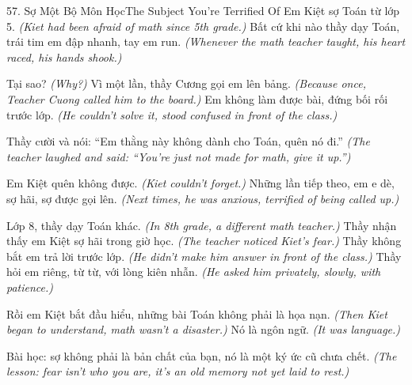 \begin{truyen}{57. Sợ Một Bộ Môn Học}{The Subject You're Terrified Of}
Em Kiệt sợ Toán từ lớp 5.
\textit{(Kiet had been afraid of math since 5th grade.)}
Bất cứ khi nào thầy dạy Toán, trái tim em đập nhanh, tay em run.
\textit{(Whenever the math teacher taught, his heart raced, his hands shook.)}

Tại sao?
\textit{(Why?)}
Vì một lần, thầy Cương gọi em lên bảng.
\textit{(Because once, Teacher Cuong called him to the board.)}
Em không làm được bài, đứng bối rối trước lớp.
\textit{(He couldn't solve it, stood confused in front of the class.)}

Thầy cười và nói: ``Em thằng này không dành cho Toán, quên nó đi.''
\textit{(The teacher laughed and said: ``You're just not made for math, give it up.'')}

Em Kiệt quên không được.
\textit{(Kiet couldn't forget.)}
Những lần tiếp theo, em e dè, sợ hãi, sợ được gọi lên.
\textit{(Next times, he was anxious, terrified of being called up.)}

Lớp 8, thầy dạy Toán khác.
\textit{(In 8th grade, a different math teacher.)}
Thầy nhận thấy em Kiệt sợ hãi trong giờ học.
\textit{(The teacher noticed Kiet's fear.)}
Thầy không bắt em trả lời trước lớp.
\textit{(He didn't make him answer in front of the class.)}
Thầy hỏi em riêng, từ từ, với lòng kiên nhẫn.
\textit{(He asked him privately, slowly, with patience.)}

Rồi em Kiệt bắt đầu hiểu, những bài Toán không phải là họa nạn.
\textit{(Then Kiet began to understand, math wasn't a disaster.)}
Nó là ngôn ngữ.
\textit{(It was language.)}

Bài học: sợ không phải là bản chất của bạn, nó là một ký ức cũ chưa chết.
\textit{(The lesson: fear isn't who you are, it's an old memory not yet laid to rest.)}
\end{truyen}

